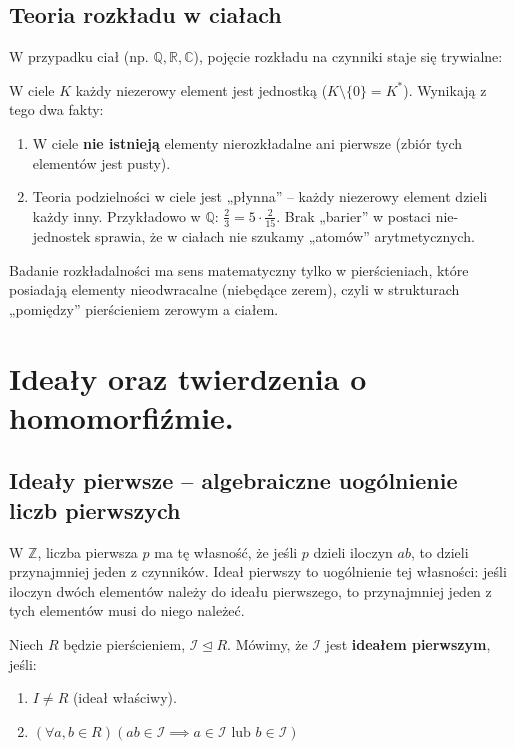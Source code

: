 \subsection*{Teoria rozkładu w ciałach}

W przypadku ciał (np. $\mathbb{Q}, \mathbb{R}, \mathbb{C}$), pojęcie rozkładu na czynniki staje się trywialne:

\begin{remark}
W ciele $K$ każdy niezerowy element jest jednostką ($K \setminus \{0\} = K^*$). Wynikają z tego dwa fakty:
\begin{enumerate}
    \item W ciele \textbf{nie istnieją} elementy nierozkładalne ani pierwsze (zbiór tych elementów jest pusty).
    \item Teoria podzielności w ciele jest „płynna” – każdy niezerowy element dzieli każdy inny. Przykładowo w $\mathbb{Q}$: $\frac{2}{3} = 5 \cdot \frac{2}{15}$. Brak „barier” w postaci nie-jednostek sprawia, że w ciałach nie szukamy „atomów” arytmetycznych.
\end{enumerate}
\end{remark}

\begin{corollary}
Badanie rozkładalności ma sens matematyczny tylko w pierścieniach, które posiadają elementy nieodwracalne (niebędące zerem), czyli w strukturach „pomiędzy” pierścieniem zerowym a ciałem.
\end{corollary}
\section{Ideały oraz twierdzenia o homomorfiźmie.}
\subsection*{Ideały pierwsze – algebraiczne uogólnienie liczb pierwszych}

\begin{intuition}
W $\mathbb{Z}$, liczba pierwsza $p$ ma tę własność, że jeśli $p$ dzieli iloczyn $ab$, to dzieli przynajmniej jeden z czynników. Ideał pierwszy to uogólnienie tej własności: jeśli iloczyn dwóch elementów należy do ideału pierwszego, to przynajmniej jeden z tych elementów musi do niego należeć.
\end{intuition}

\begin{definition}
Niech $R$ będzie pierścieniem, $\mathcal{I} \trianglelefteq R$. Mówimy, że $\mathcal{I}$ jest \textbf{ideałem pierwszym}, jeśli:
\begin{enumerate}[label=\arabic*)]
    \item $I \neq R$ (ideał właściwy).
    \item $\left(\forall a,b \in R \right)\left( ab \in \mathcal{I} \implies a\in \mathcal{I} \text{ lub } b \in \mathcal{I} \right)  $
\end{enumerate}
\end{definition}

